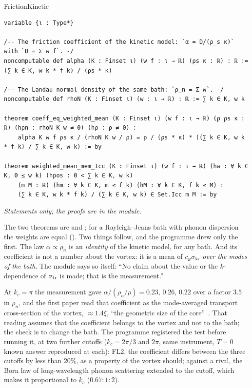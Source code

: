 \begin{leanbox}[unbreakable]{FrictionKinetic}
\begin{lstlisting}[style=lean,basicstyle=\ttfamily\footnotesize]
variable {ι : Type*}

/-- The friction coefficient of the kinetic model: `α = D/(ρ_s κ)` with `D = Σ w f`. -/
noncomputable def alpha (K : Finset ι) (w f : ι → ℝ) (ρs κ : ℝ) : ℝ := (∑ k ∈ K, w k * f k) / (ρs * κ)

/-- The Landau normal density of the same bath: `ρ_n = Σ w`. -/
noncomputable def rhoN (K : Finset ι) (w : ι → ℝ) : ℝ := ∑ k ∈ K, w k

theorem coeff_eq_weighted_mean (K : Finset ι) (w f : ι → ℝ) (ρ ρs κ : ℝ) (hρn : rhoN K w ≠ 0) (hρ : ρ ≠ 0) :
    alpha K w f ρs κ / (rhoN K w / ρ) = ρ / (ρs * κ) * ((∑ k ∈ K, w k * f k) / ∑ k ∈ K, w k) := by

theorem weighted_mean_mem_Icc (K : Finset ι) (w f : ι → ℝ) (hw : ∀ k ∈ K, 0 ≤ w k) (hpos : 0 < ∑ k ∈ K, w k)
    (m M : ℝ) (hm : ∀ k ∈ K, m ≤ f k) (hM : ∀ k ∈ K, f k ≤ M) :
    (∑ k ∈ K, w k * f k) / (∑ k ∈ K, w k) ∈ Set.Icc m M := by
\end{lstlisting}
\nopagebreak[4]\smallskip\noindent\textit{Statements only; the proofs are in the module.}
\end{leanbox}

The two theorems are  and ; for a Rayleigh--Jeans bath with phonon dispersion the weights are equal (). Two things follow, and the programme drew only the first. The law $\alpha\propto\rho_n$ is an
\emph{identity} of the kinetic model, for any bath. And its coefficient is not a number about the vortex: it is a mean of $c_g\sigma_{\rm tr}$ \emph{over the modes of the bath}. The module says so itself: ``No claim about the value or the $k$-dependence of $\sigma_{\rm tr}$ is made; that is the measurement.''

At $k_c=\pi$ the measurement gave $\alpha/(\rho_n/\rho)=0.23,\,0.26,\,0.22$ over a factor $3.5$ in $\rho_n$, and the first paper read that coefficient as the mode-averaged transport cross-section of the vortex, $\approx1.4\xi$, ``the geometric size of the core''~\cite{Callens2026a}. That reading assumes that the coefficient belongs to the vortex and not to the bath; the check is to change the bath. The programme registered the test before running it, at two further
cutoffs ($k_c=2\pi/3$ and $2\pi$, same instrument, $T=0$ known answer reproduced at each): FL2, the coefficient differs between the three cutoffs by less than $20\%$, as a property of the vortex should; against a rival, the Born law of long-wavelength phonon scattering extended to the cutoff, which makes it proportional to $k_c$ ($0.67:1:2$).

